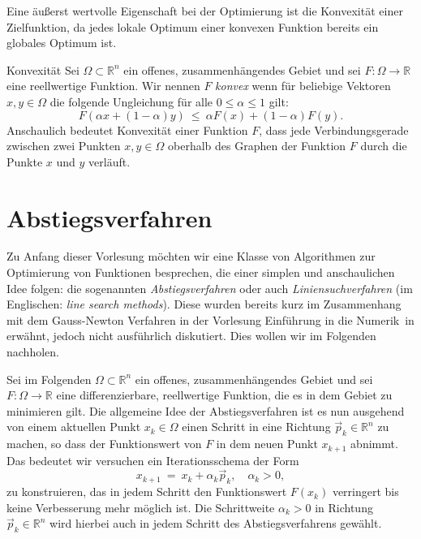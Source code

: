 Eine äußerst wertvolle Eigenschaft bei der Optimierung ist die Konvexität einer Zielfunktion, da jedes lokale Optimum einer konvexen Funktion bereits ein globales Optimum ist.
\begin{definition}{Konvexität}{}
Sei $\Omega \subset \mathbb{R}^n$ ein offenes, zusammenhängendes Gebiet und sei $F \colon \Omega \rightarrow \mathbb{R}$ eine reellwertige Funktion. Wir nennen $F$ \emph{konvex} wenn für beliebige Vektoren $x,y \in \Omega$ die folgende Ungleichung für alle $0 \leq \alpha \leq 1$ gilt:
\begin{equation*}
F(\alpha x + (1-\alpha)y) \ \leq \ \alpha F(x) + (1-\alpha)F(y).
\end{equation*}
Anschaulich bedeutet Konvexität einer Funktion $F$, dass jede Verbindungsgerade zwischen zwei Punkten $x,y \in \Omega$ oberhalb des Graphen der Funktion $F$ durch die Punkte $x$ und $y$ verläuft.
\end{definition}

\section{Abstiegsverfahren}
\label{s:abstiegsverfahren}
Zu Anfang dieser Vorlesung möchten wir eine Klasse von Algorithmen zur Optimierung von Funktionen besprechen, die einer simplen und anschaulichen Idee folgen: die sogenannten \textit{Abstiegsverfahren} oder auch \textit{Liniensuchverfahren} (im Englischen: \textit{line search methods}).
Diese wurden bereits kurz im Zusammenhang mit dem Gauss-Newton Verfahren in der Vorlesung \glqq Einführung in die Numerik\grqq~in \cite[Kapitel 5.4]{numerik1} erwähnt, jedoch nicht ausführlich diskutiert. 
Dies wollen wir im Folgenden nachholen.

Sei im Folgenden $\Omega \subset \mathbb{R}^n$ ein offenes, zusammenhängendes Gebiet und sei $F \colon \Omega \rightarrow \mathbb{R}$ eine differenzierbare, reellwertige Funktion, die es in dem Gebiet zu minimieren gilt.
Die allgemeine Idee der Abstiegsverfahren ist es nun ausgehend von einem aktuellen Punkt $x_k \in \Omega$ einen Schritt in eine Richtung $\vec{p}_k \in \mathbb{R}^n$ zu machen, so dass der Funktionswert von $F$ in dem neuen Punkt $x_{k+1}$ abnimmt.
Das bedeutet wir versuchen ein Iterationsschema der Form
\begin{equation}
\label{eq:abstiegsverfahren}
x_{k+1} \ = \ x_k + \alpha_k \vec{p}_k, \quad \alpha_k > 0,
\end{equation}
zu konstruieren, das in jedem Schritt den Funktionswert $F(x_k)$ verringert bis keine Verbesserung mehr möglich ist.
Die Schrittweite $\alpha_k > 0$ in Richtung $\vec{p}_k \in \mathbb{R}^n$ wird hierbei auch in jedem Schritt des Abstiegsverfahrens gewählt.

